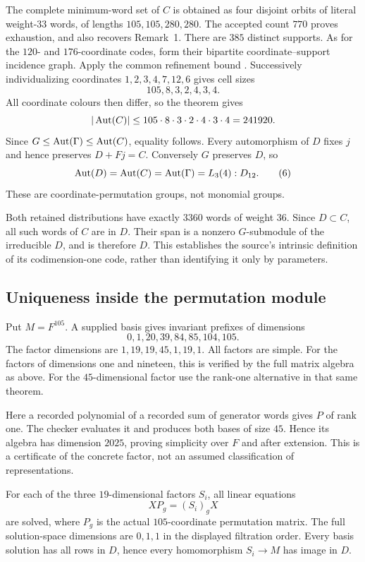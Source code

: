 The complete minimum-word set of $C$ is obtained as four disjoint orbits
of literal weight-$33$ words, of lengths $105,105,280,280$.
The accepted count $770$ proves exhaustion, and also recovers Remark~1.
There are $385$ distinct supports. As for the $120$- and $176$-coordinate
codes, form their bipartite coordinate--support incidence graph.
Apply the common refinement bound \cite[Theorem~6.4]{U}. 
Successively individualizing
coordinates $1,2,3,4,7,12,6$ gives cell sizes
\[
 105,8,3,2,4,3,4.
\]
All coordinate colours then differ, so the theorem gives
\[
 |\operatorname{Aut}(C)|\leq105\cdot8\cdot3\cdot2\cdot4\cdot3\cdot4=241920.
\]
Since $G\leq\operatorname{Aut}(\Gamma)\leq\operatorname{Aut}(C)$, equality follows.
Every automorphism of $D$ fixes $j$ and hence preserves $D+Fj=C$.
Conversely $G$ preserves $D$, so
\[
 \operatorname{Aut}(D)=\operatorname{Aut}(C)=\operatorname{Aut}(\Gamma)=L_3(4):D_{12}.          \tag{6}
\]
These are coordinate-permutation groups, not monomial groups.

Both retained distributions have exactly $3360$ words of weight $36$.
Since $D\subset C$, all such words of $C$ are in $D$.
Their span is a nonzero $G$-submodule of the irreducible $D$, and is
therefore $D$. This establishes the source's intrinsic definition of its
codimension-one code, rather than identifying it only by parameters.

\subsection{Uniqueness inside the permutation module}
Put $M=F^{105}$. A supplied basis gives invariant prefixes of dimensions
\[
 0,1,20,39,84,85,104,105.
\]
The factor dimensions are $1,19,19,45,1,19,1$.
All factors are simple. For the factors of dimensions one and nineteen,
this is verified by the full matrix algebra as above. For the $45$-dimensional factor use the rank-one alternative in that same theorem.

Here a recorded polynomial of a recorded sum of generator words gives
$P$ of rank one. The checker evaluates it and produces both bases of
size $45$. Hence its algebra has dimension $2025$, proving simplicity
over $F$ and after extension. This is a certificate of the concrete
factor, not an assumed classification of representations.

For each of the three $19$-dimensional factors $S_i$, all linear equations
\[
 XP_g=(S_i)_gX
\]
are solved, where $P_g$ is the actual $105$-coordinate permutation
matrix. The full solution-space dimensions are $0,1,1$ in the displayed
filtration order. Every basis solution has all rows in $D$, hence every
homomorphism $S_i\to M$ has image in $D$.

